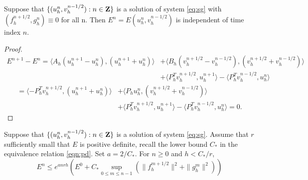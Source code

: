 \begin{theorem}
Suppose that $\{(u_h^n,v^{n-1/2}_h): n \in {\bf Z}\}$ is a solution of
system \ref{eq:sg} with $(f^{n+1/2}_h, g^n_h)\equiv 0$ for all n. 
Then $E^n=E(u_h^n,v^{n-1/2}_h)$ is independent of time index $n$.
\end{theorem}

\begin{proof}
\begin{equation*}
\begin{split}
	E^{n+1} - E^n =\langle A_h( u^{n+1}_h-u^n_h ), (u^{n+1}_h+u^n_h)\rangle 
		&+ \langle B_h( v^{n+1/2}_h-v^{n-1/2}_h ), (v^{n+1/2}_h+v^{n-1/2}_h)\rangle \\
		&+ \langle P_h^T v^{n+1/2}_h, u^{n+1}_h\rangle - \langle P_h^T v^{n-1/2}_h, u^n_h\rangle
\end{split}
\end{equation*} 
\begin{equation*}
\begin{split}
	= \langle -P_h^Tv^{n+1/2}_h,(u^{n+1}_h+u^n_h) \rangle 
		&+ \langle P_hu^n_h, (v^{n+1/2}_h+v^{n-1/2}_h) \rangle\\
		&+\langle P_h^Tv^{n+1/2}_h,u^{n+1}_h\rangle - \langle P^T_h v^{n-1/2}_h,u^n_h\rangle
	=0.
\end{split}
\end{equation*}
\end{proof}



\begin{theorem}
\label{thm:inhom}
Suppose that $\{(u_h^n,v^{n-1/2}_h): n \in {\bf Z}\}$ is a solution of
system \ref{eq:sg}. Assume that $r$ sufficiently small that $E$ is
positive definite, recall the lower bound $C_*$ in the 
equivalence relation \ref{eqn:pd}. Set $a = 2/C_*$. For $n \ge 0$ and $h < C_*/r$,
\begin{equation}
\label{eq:inhom}
	E^n \le e^{anrh} \left(E^0 + 
	C_* \sup_{0 \le m \le n-1}(\|f^{m+1/2}_h\|^2 + \|g^m_h\|^2)\right)
\end{equation}
\end{theorem}

